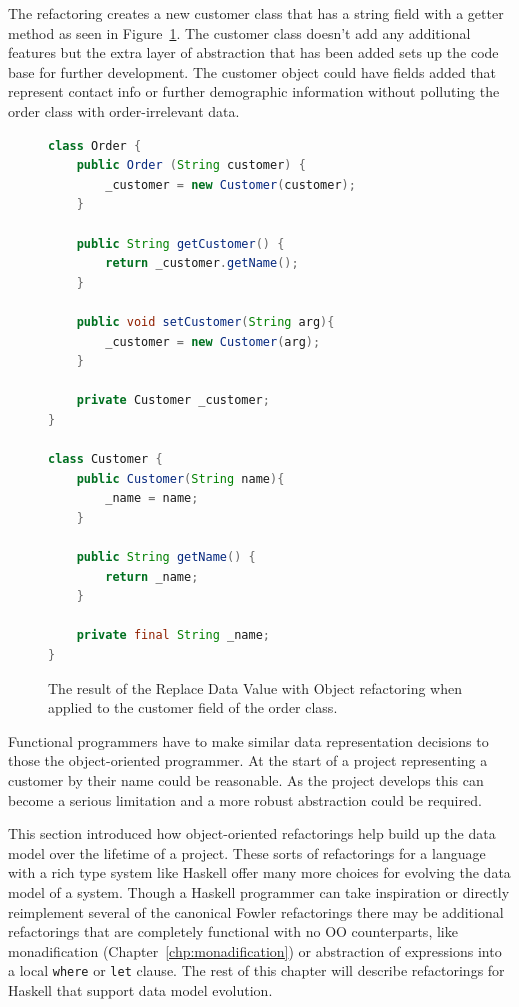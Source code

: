 The refactoring creates a new customer class that has a string field with a getter method as seen in Figure~\ref{custCls}. The customer class doesn't add any additional features but the extra layer of abstraction that has been added sets up the code base for further development. The customer object could have fields added that represent contact info or further demographic information without polluting the order class with order-irrelevant data.

\begin{figure}[t]
\begin{lstlisting}[language = java,tabsize=4]
class Order {
	public Order (String customer) {
		_customer = new Customer(customer);	
	}
	
	public String getCustomer() {
		return _customer.getName();
	}
	
	public void setCustomer(String arg){
		_customer = new Customer(arg);	
	}
	
	private Customer _customer;
}

class Customer {
	public Customer(String name){
		_name = name;
	}
	
	public String getName() {
		return _name;
	}
	
	private final String _name;
}
\end{lstlisting}
\caption{The result of the Replace Data Value with Object refactoring when applied to the customer field of the order class.}
\label{custCls}
\end{figure}

Functional programmers have to make similar data representation decisions to those the object-oriented programmer. At the start of a project representing a customer by their name could be reasonable. As the project develops this can become a serious limitation and a more robust abstraction could be required. 

This section introduced how object-oriented refactorings help build up the data model over the lifetime of a project. These sorts of refactorings for a language with a rich type system like Haskell offer many more choices for evolving the data model of a system. Though a Haskell programmer can take inspiration or directly reimplement several of the canonical Fowler refactorings there may be additional refactorings that are completely functional with no OO counterparts, like monadification (Chapter~\ref{chp:monadification}) or abstraction of expressions into a local \texttt{where} or \texttt{let} clause. The rest of this chapter will describe refactorings for Haskell that support data model evolution.  

